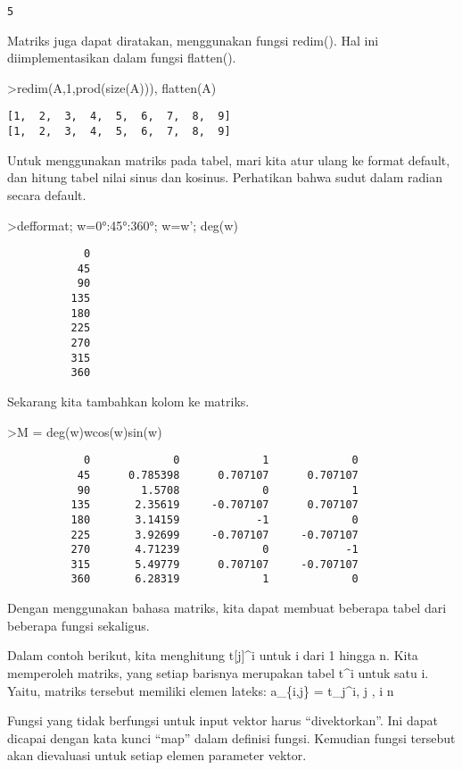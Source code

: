 \documentclass[
]{book}
\begin{document}
\begin{verbatim}
5
\end{verbatim}

Matriks juga dapat diratakan, menggunakan fungsi redim(). Hal ini diimplementasikan dalam fungsi flatten().

\textgreater redim(A,1,prod(size(A))), flatten(A)

\begin{verbatim}
[1,  2,  3,  4,  5,  6,  7,  8,  9]
[1,  2,  3,  4,  5,  6,  7,  8,  9]
\end{verbatim}

Untuk menggunakan matriks pada tabel, mari kita atur ulang ke format default, dan hitung tabel nilai sinus dan kosinus. Perhatikan bahwa sudut dalam radian secara default.

\textgreater defformat; w=0°:45°:360°; w=w'; deg(w)

\begin{verbatim}
            0 
           45 
           90 
          135 
          180 
          225 
          270 
          315 
          360 
\end{verbatim}

Sekarang kita tambahkan kolom ke matriks.

\textgreater M = deg(w)\textbar w\textbar cos(w)\textbar sin(w)

\begin{verbatim}
            0             0             1             0 
           45      0.785398      0.707107      0.707107 
           90        1.5708             0             1 
          135       2.35619     -0.707107      0.707107 
          180       3.14159            -1             0 
          225       3.92699     -0.707107     -0.707107 
          270       4.71239             0            -1 
          315       5.49779      0.707107     -0.707107 
          360       6.28319             1             0 
\end{verbatim}

Dengan menggunakan bahasa matriks, kita dapat membuat beberapa tabel dari beberapa fungsi sekaligus.

Dalam contoh berikut, kita menghitung t{[}j{]}\^{}i untuk i dari 1 hingga n. Kita memperoleh matriks, yang setiap barisnya merupakan tabel t\^{}i untuk satu i. Yaitu, matriks tersebut memiliki elemen lateks: a\_\{i,j\} = t\_j\^{}i,  \le j ,  \le i \le n

Fungsi yang tidak berfungsi untuk input vektor harus ``divektorkan''. Ini dapat dicapai dengan kata kunci ``map'' dalam definisi fungsi. Kemudian fungsi tersebut akan dievaluasi untuk setiap elemen parameter vektor.
\end{document}
